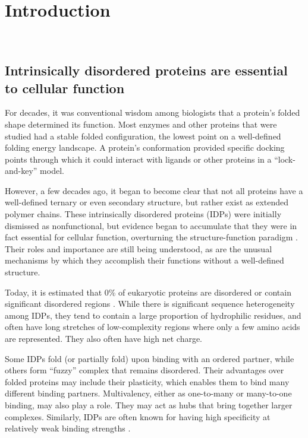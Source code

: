 \chapter{Introduction}~\label{ch01_introduction}


\section{Intrinsically disordered proteins are essential to cellular function}
For decades, it was conventional wisdom among biologists that a protein's folded shape determined its function.  Most enzymes and other proteins that were studied had a stable folded configuration, the lowest point on a well-defined folding energy landscape.  A protein's conformation provided specific docking points through which it could interact with ligands or other proteins in a ``lock-and-key'' model.

However, a few decades ago, it began to become clear that not all proteins have a well-defined ternary or even secondary structure, but rather exist as extended polymer chains.  These intrinsically disordered proteins (IDPs) were initially dismissed as nonfunctional, but evidence began to accumulate that they were in fact essential for cellular function, overturning the structure-function paradigm \cite{uversky13}.  Their roles and importance are still being understood, as are the unusual mechanisms by which they accomplish their functions without a well-defined structure.

Today, it is estimated that 0\% of eukaryotic proteins are disordered or contain significant disordered regions \cite{uversky13}.  While there is significant sequence heterogeneity among IDPs, they tend to contain a large proportion of hydrophilic residues, and often have long stretches of low-complexity regions where only a few amino acids are represented.  They also often have high net charge.

Some IDPs fold (or partially fold) upon binding with an ordered partner, while others form ``fuzzy'' complex that remains disordered.  Their advantages over folded proteins may include their plasticity, which enables them to bind many different binding partners.  Multivalency, either as one-to-many or many-to-one binding, may also play a role.  They may act as hubs that bring together larger complexes.  Similarly, IDPs are often known for having high specificity at relatively weak binding strengths \cite{uversky13}.

